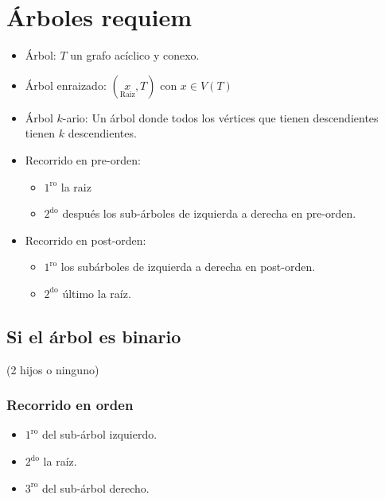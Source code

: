 \documentclass[../main.tex]{subfiles}
\begin{document}
\chapter{Árboles requiem}%

\thispagestyle{fancy}

\begin{itemize}
	\item Árbol: $T$ un grafo acíclico y conexo.
	\item Árbol enraizado:
		\(
			(
			\underset
			{
				\text{Raiz}
			}
			{
				x
			}
			,T)
		\)
		con $x\in V(T)$
	\item Árbol $k$-ario: Un árbol donde todos los vértices que tienen
		descendientes tienen $k$ descendientes.
	\item Recorrido en pre-orden:
		\begin{itemize}
			\item $1^{\text{ro}}$ la raiz
			\item $2^{\text{do}}$ después los sub-árboles de izquierda a
				derecha en pre-orden.
		\end{itemize}
	\item Recorrido en post-orden:
		\begin{itemize}
			\item $1^{\text{ro}}$ los subárboles de izquierda a derecha
				en post-orden.
			\item $2^{\text{do}}$ último la raíz.
		\end{itemize}
\end{itemize}

\section{Si el árbol es binario}%
\label{sec:si_el_arbol_es_binario}
(2 hijos o ninguno)

\subsection{Recorrido en orden}%
\label{sub:recorrido_en_orden}

\begin{itemize}
	\item $1^{\text{ro}}$  del sub-árbol
		izquierdo.
	\item $2^{\text{do}}$ la raíz.
	\item $3^{\text{ro}}$  del sub-árbol derecho.
\end{itemize}
\end{document}
